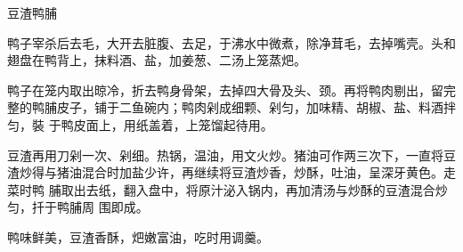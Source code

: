 \begin{recipe}{豆渣鸭脯}

\ingredients



\preparation

\step 鸭子宰杀后去毛，大开去脏腹、去足，于沸水中微煮，除净茸毛，去掉嘴壳。头和
翅盘在鸭背上，抹料酒、盐，加姜葱、二汤上笼蒸𤆵。

\step 鸭子在笼内取出晾冷，折去鸭身骨架，去掉四大骨及头、颈。再将鸭肉剔出，留完
整的鸭脯皮子，铺于二鱼碗内；鸭肉剁成细颗、剁匀，加味精、胡椒、盐、料酒拌匀，裝
于鸭皮面上，用纸盖着，上笼馏起待用。

\step 豆渣再用刀剁一次、剁细。热锅，温油，用文火炒。猪油可作两三次下，一直将豆
渣炒得与猪油混合时加盐少许，再继续将豆渣炒香，炒酥，吐油，呈深牙黄色。走菜时鸭
脯取出去纸，翻入盘中，将原汁泌入锅内，再加清汤与炒酥的豆渣混合炒匀，扦于鸭脯周
围即成。

\features

鸭味鲜美，豆渣香酥，𤆵嫩富油，吃时用调羹。

\end{recipe}

